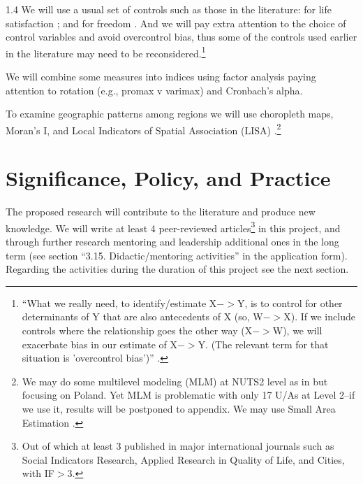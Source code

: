 \documentclass[10pt, letterpaper]{article}
\begin{document}
\begin{spacing}{1.4}
We will use a usual set of controls such as those in the literature: 
for life satisfaction \citep[e.g.,][]{aokcities}; %
and for freedom
\citep[e.g.,][]{pitlik2016free,nikolaev2016give}. 
  And %
 we will pay extra attention to the choice 
 of control variables and avoid overcontrol bias, thus some of the controls used
 earlier in the literature may need to be reconsidered.\footnote{
``What we really need, to identify/estimate X$->$Y, is to control for other
determinants of Y that are also antecedents of X (so, W$->$X). If we include
controls where the relationship goes the other way (X$->$W), we will exacerbate
bias in our estimate of X$->$Y. (The relevant term for that situation is
'overcontrol bias')'' \citep[][p. 5]{bartram24}.
}

We will combine some measures into indices using factor analysis paying attention
to rotation (e.g., promax v varimax) \citep{agencyScale25} and Cronbach's
alpha. 

To examine geographic patterns among regions we will use choropleth maps,
Moran's I, and Local Indicators of Spatial Association (LISA) \citep{anselin1995local}.\footnote{ 
We may do some multilevel modeling (MLM) at NUTS2 level as in
\citet{weckroth21} but focusing on Poland. Yet MLM is problematic with only 17
U/As at Level 2--if we use it, results will be postponed to appendix. 
We may use Small Area Estimation \citep{moretti24}. 
}



\section{Significance, Policy, and Practice}


The proposed research will contribute to the literature and produce new
knowledge.   
 We will write at least 4 peer-reviewed articles\footnote{Out of which at least
   3  published in major international journals such as Social Indicators
 Research, Applied Research in Quality of Life, and Cities, with IF$>$3.} in this project, and through further research
mentoring and leadership additional ones in the long term (see section
``3.15. Didactic/mentoring activities'' in the application form). Regarding the
activities during the duration of this project see the next section. 


\end{spacing}
\end{document}
